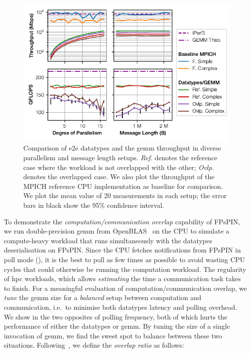 \begin{figure}[tp]
    \centering
    \includegraphics{figures/datatypes-tput.pdf}
    \caption{Comparison of \ac{e2e} datatypes and the \ac{gemm} throughput in diverse parallelism and message length setups.  \emph{Ref.} denotes the reference case where the workload is not overlapped with the other; \emph{Ovlp.} denotes the overlapped case.  We also plot the throughput of the MPICH reference CPU implementation as baseline for comparison.  We plot the mean value of 20 measurements in each setup; the error bars in black show the 95\% confidence interval.} \label{fig:datatypes-tput}
\end{figure}

To demonstrate the \emph{computation/communication overlap} capability of FPsPIN, we run double-precision \ac{gemm} from OpenBLAS~\cite{xianyi_model-driven_2012} on the CPU to simulate a compute-heavy workload that runs simultaneously with the datatypes deserialisation on FPsPIN.  Since the CPU fetches notifications from FPsPIN in poll mode (), it is the best to poll as few times as possible to avoid wasting CPU cycles that could otherwise be running the computation workload.  The regularity of \ac{hpc} workloads, which allows \emph{estimating} the time a communication task takes to finish.  For a meaningful evaluation of computation/communication overlap, we \emph{tune} the \ac{gemm} size for a \emph{balanced} setup between computation and communication, i.e.\ to minimise both datatypes latency and polling overhead.  We show in  the two opposites of polling frequency, both of which hurts the performance of either the datatypes or \ac{gemm}.  By tuning the size of a single invocation of \ac{gemm}, we find the sweet spot to balance between these two situations.  Following~\cite{hoefler_implementation_2007}, we define the \emph{overlap ratio} as follows:


